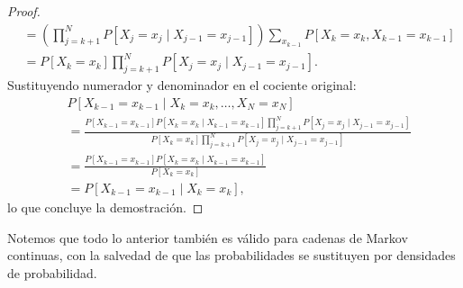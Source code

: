 \documentclass[12pt]{article}
\begin{document}
\begin{proof}
\begin{align*}
    &= \left( \prod_{j=k+1}^{N} P[X_j = x_j \mid X_{j-1} = x_{j-1}] \right) \sum_{x_{k-1}} P[X_k = x_k, X_{k-1} = x_{k-1}] \\
    &= P[X_k = x_k] \prod_{j=k+1}^{N} P[X_j = x_j \mid X_{j-1} = x_{j-1}].
  \end{align*}
  Sustituyendo numerador y denominador en el cociente original:
  \begin{align*}
    &P[X_{k-1} = x_{k-1} \mid X_k = x_k, \ldots, X_N = x_N] \\
    &= \frac{P[X_{k-1} = x_{k-1}] P[X_k = x_k \mid X_{k-1} = x_{k-1}] \prod\limits_{j=k+1}^{N} P[X_j = x_j \mid X_{j-1} = x_{j-1}]}{P[X_k = x_k] \prod\limits_{j=k+1}^{N} P[X_j = x_j \mid X_{j-1} = x_{j-1}]} \\
    &= \frac{P[X_{k-1} = x_{k-1}] P[X_k = x_k \mid X_{k-1} = x_{k-1}]}{P[X_k = x_k]} \\
    &= P[X_{k-1} = x_{k-1} \mid X_k = x_k],
  \end{align*}
  lo que concluye la demostración.
\end{proof}

Notemos que todo lo anterior también es válido para cadenas de Markov continuas, con la salvedad de que las probabilidades se sustituyen por densidades de probabilidad.
\end{document}
